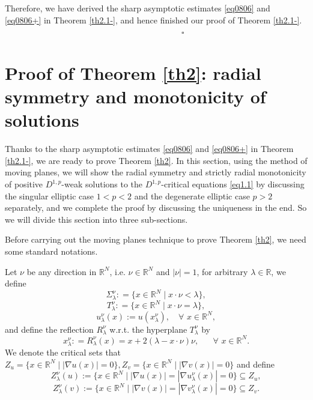 \documentclass[12pt]{amsart}
\theoremstyle{definition}
\theoremstyle{remark}
\theoremstyle{conclusion}
\theoremstyle{conjecture}
\numberwithin{equation}{section}
\newcommand{\R}{\mathbb{R}}
\begin{document}
Therefore, we have derived the sharp asymptotic estimates \eqref{eq0806} and \eqref{eq0806+} in Theorem \ref{th2.1-}, and hence finished our proof of Theorem \ref{th2.1-}. $\qquad\qquad\qquad\qquad\qquad\qquad\qquad\qquad\qquad\qquad\quad\square$




\section{Proof of Theorem \ref{th2}: radial symmetry and monotonicity of solutions}\label{sc4}

Thanks to the sharp asymptotic estimates \eqref{eq0806} and \eqref{eq0806+} in Theorem \ref{th2.1-}, we are ready to prove Theorem \ref{th2}. In this section, using the method of moving planes, we will show the radial symmetry and strictly radial monotonicity of positive $D^{1,p}$-weak solutions to the $D^{1,p}$-critical equations \eqref{eq1.1} by discussing the singular elliptic case $1<p<2$ and the degenerate elliptic case $p>2$ separately, and we complete the proof by discussing the uniqueness in the end. So we will divide this section into three sub-sections.

\medskip

Before carrying out the moving planes technique to prove Theorem \ref{th2}, we need some standard notations.

\smallskip

Let $\nu$ be any direction in $\R^N$, i.e. $\nu\in \R^N$ and $|\nu|=1$, for arbitrary $\lambda\in\R$, we define
$$ \Sigma_\lambda^\nu : =\{ x\in\R^N \mid x \cdot \nu < \lambda \}, $$
$$ T_\lambda^\nu : =\{ x\in\R^N \mid x \cdot \nu = \lambda \},$$
$$ u^\nu_\lambda (x) := u(x^\nu_\lambda), \quad \forall \,\, x\in\R^N,$$
and define the reflection $R^\nu_\lambda$ w.r.t. the hyperplane $T^\nu_\lambda$ by
$$ x_\lambda^\nu : =R^\nu_\lambda(x)= x + 2(\lambda-x\cdot \nu)\nu,\quad\,\,\,\,\forall \,\, x\in\R^N.$$
We denote the critical sets that $Z_u=\{ x\in\R^N \mid |\nabla u (x)|=0\}, Z_v=\{ x\in\R^N \mid |\nabla v (x)|=0\}$ and define
\begin{equation}\label{Z}
  Z_\lambda^\nu(u) :=\{ x\in\R^N \mid |\nabla u (x)|=|\nabla u_\lambda^\nu (x)|=0 \} \subseteq  Z_u,
\end{equation}
\begin{equation}\label{Z'}
  Z_\lambda^\nu(v) :=\{ x\in\R^N \mid |\nabla v (x)|=|\nabla v_\lambda^\nu (x)|=0 \} \subseteq  Z_v.
\end{equation}
\end{document}
